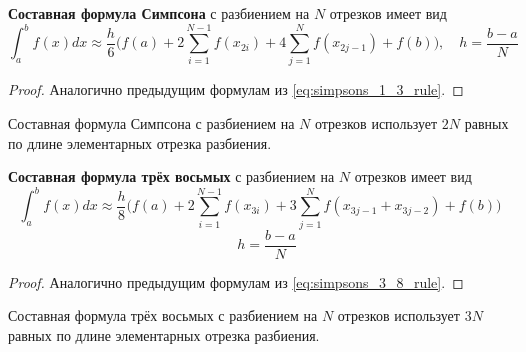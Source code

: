 \documentclass[../main.tex]{subfile}
\begin{document}
\begin{theorem}
	\textbf{Составная формула Симпсона} с разбиением на $N$ отрезков имеет вид
	\[\boxed{\int_a^b f(x)dx\approx \frac{h}{6}\Big(f(a)+2\sum_{i=1}^{N-1}
	f(x_{2i})+4\sum_{j=1}^{N}f(x_{2j-1})+f(b)\Big),\quad h=\frac{b-a}{N}}\]
\end{theorem}

\begin{proof}
	Аналогично предыдущим формулам из \eqref{eq:simpsons_1_3_rule}.
\end{proof}

\begin{remark}
	Составная формула Симпсона с разбиением на $N$ отрезков использует $2N$
	равных по длине элементарных отрезка разбиения.
\end{remark}
\newpage

\begin{theorem}
	\textbf{Составная формула трёх восьмых} с разбиением на $N$ отрезков
	имеет вид
	\[\boxed{\int_a^b f(x)dx\approx \frac{h}{8}\Big(f(a)+2\sum_{i=1}^{N-1}
	f(x_{3i})+3\sum_{j=1}^{N}f(x_{3j-1}+x_{3j-2})+f(b)\Big)}\]
	\[\quad h=\frac{b-a}{N}\]
\end{theorem}

\begin{proof}
	Аналогично предыдущим формулам из \eqref{eq:simpsons_3_8_rule}.
\end{proof}

\begin{remark}
	Составная формула трёх восьмых с разбиением на $N$ отрезков использует
	$3N$
	равных по длине элементарных отрезка разбиения.
\end{remark}
\end{document}

